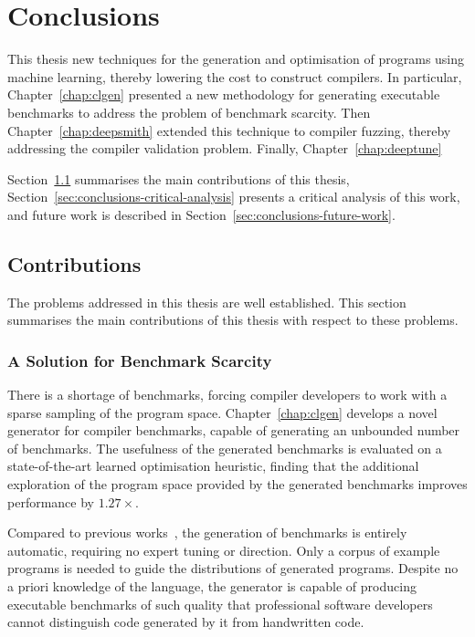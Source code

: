 \chapter{Conclusions}
\label{chap:conclusions}

This thesis new techniques for the generation and optimisation of programs using machine learning, thereby lowering the cost to construct compilers. In particular, Chapter~\ref{chap:clgen} presented a new methodology for generating executable benchmarks to address the problem of benchmark scarcity. Then Chapter~\ref{chap:deepsmith} extended this technique to compiler fuzzing, thereby addressing the compiler validation problem. Finally, Chapter~\ref{chap:deeptune}

Section~\ref{sec:conclusions-contributions} summarises the main contributions of this thesis, Section~\ref{sec:conclusions-critical-analysis} presents a critical analysis of this work, and future work is described in Section~\ref{sec:conclusions-future-work}.


\section{Contributions}
\label{sec:conclusions-contributions}

The problems addressed in this thesis are well established. This section summarises the main contributions of this thesis with respect to these problems.


\subsection{A Solution for Benchmark Scarcity}

There is a shortage of benchmarks, forcing compiler developers to work with a sparse sampling of the program space. Chapter~\ref{chap:clgen} develops a novel generator for compiler benchmarks, capable of generating an unbounded number of benchmarks. The usefulness of the generated benchmarks is evaluated on a state-of-the-art learned optimisation heuristic, finding that the additional exploration of the program space provided by the generated benchmarks improves performance by $1.27\times$.

Compared to previous works~\cite{Chiu2015}, the generation of benchmarks is entirely automatic, requiring no expert tuning or direction. Only a corpus of example programs is needed to guide the distributions of generated programs. Despite no a priori knowledge of the language, the generator is capable of producing executable benchmarks of such quality that professional software developers cannot distinguish code generated by it from handwritten code.

